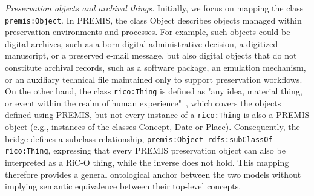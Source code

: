 \documentclass[runningheads]{llncs}
\begin{document}
\emph{Preservation objects and archival things.} Initially, we focus on mapping the class \texttt{premis:Object}. In PREMIS, the class Object describes objects managed within preservation environments and processes. For example, such objects could be digital archives, such as a born-digital administrative decision, a digitized manuscript, or a preserved e-mail message, but also digital objects that do not constitute archival records, such as a software package, an emulation mechanism, or an auxiliary technical file maintained only to support preservation workflows. On the other hand, the class \texttt{rico:Thing} is defined as "any idea, material thing, or event within the realm of human experience"~\cite{RICCM}, which covers the objects defined using PREMIS, but not every instance of a \texttt{rico:Thing} is also a PREMIS object (e.g., instances of the classes Concept, Date or Place). Consequently, the bridge defines a subclass relationship, \texttt{premis:Object rdfs:subClassOf rico:Thing}, expressing that every PREMIS preservation object can also be interpreted as a RiC-O thing, while the inverse does not hold. This mapping therefore provides a general ontological anchor between the two models without implying semantic equivalence between their top-level concepts.
\end{document}
